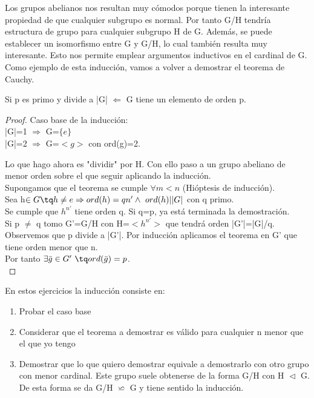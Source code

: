\documentclass{apuntes}
\begin{document}
Los grupos abelianos nos resultan muy cómodos porque tienen la interesante propiedad de que cualquier subgrupo es normal. Por tanto
G/H tendría estructura de grupo para cualquier subgrupo H de G. Además, se puede establecer un isomorfismo entre G y G/H, lo cual también 
resulta muy interesante. Esto nos permite emplear argumentos inductivos en el cardinal de G.\\
Como ejemplo de esta inducción, vamos a volver a demostrar el teorema de Cauchy.
\begin{theorem}
 Si p es primo y divide a |G| $\Leftarrow$  G tiene un elemento de orden p.
\end{theorem}
\begin{proof}
 Caso base de la inducción:\\
 |G|=1 $\Rightarrow$ G=$\{e\}$ \\
 |G|=2 $\Rightarrow$  G=$<g>$  con ord(g)=2.
 
 Lo que hago ahora es "dividir" por H. Con ello paso a un grupo abeliano de menor orden sobre el que seguir aplicando la inducción.\\
 Supongamos que el teorema se cumple $\forall m < n$  (Hióptesis de inducción).\\
 Sea h$\in G \tq h\neq e\Rightarrow ord(h)=qn' \wedge \ ord(h)| |G|$  con q primo.\\
 Se cumple que $h^{n'}$  tiene orden q. Si q=p, ya está terminada la demostración.\\
 Si p $\neq$ q tomo G'=G/H con H=$<h^{n'}>$  que tendrá orden |G'|=|G|/q.\\
 Observemos que p divide a |G'|. Por inducción aplicamos el teorema en G' que tiene orden menor que n.\\
 Por tanto $\exists \bar{g}\in G' \ \tq ord(\bar{g})=p$.\\
\end{proof}

\begin{defn}[Inducción]
 En estos ejercicios la inducción consiste en:
 \begin{enumerate}
  \item Probar el caso base
  \item Considerar que el teorema a demostrar es válido para cualquier n menor que el que yo tengo
  \item Demostrar que lo que quiero demostrar equivale a demostrarlo con otro grupo con menor cardinal. Este grupo suele obtenerse
  de la forma G/H con H $\vartriangleleft$ G. De esta forma se da G/H $\backsimeq$ G y tiene sentido la inducción.
 \end{enumerate}
\end{defn}
\end{document}
